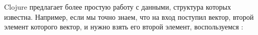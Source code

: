 Clojure предлагает более простую работу с данными, структура которых
известна. Например, если мы точно знаем, что на вход поступил вектор, второй
элемент которого вектор, и нужно взять его второй элемент, воспользуемся
:















